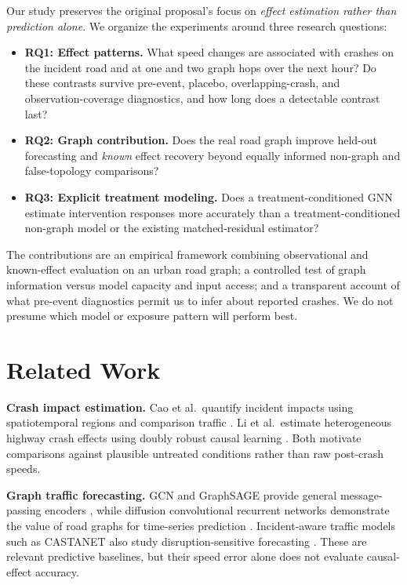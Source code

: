 \documentclass[sigconf,nonacm]{acmart}
\begin{document}
Our study preserves the original proposal's focus on \emph{effect
estimation rather than prediction alone}. We organize the experiments
around three research questions:
\begin{itemize}
  \item \textbf{RQ1: Effect patterns.} What speed changes are associated
  with crashes on the incident road and at one and two graph hops over
  the next hour? Do these contrasts survive pre-event, placebo,
  overlapping-crash, and observation-coverage diagnostics, and how
  long does a detectable contrast last?
  \item \textbf{RQ2: Graph contribution.} Does the real road graph
  improve held-out forecasting and \emph{known} effect recovery beyond
  equally informed non-graph and false-topology comparisons?
  \item \textbf{RQ3: Explicit treatment modeling.} Does a
  treatment-conditioned GNN estimate intervention responses more
  accurately than a treatment-conditioned non-graph model or the
  existing matched-residual estimator?
\end{itemize}

The contributions are an empirical framework combining observational
and known-effect evaluation on an urban road graph; a controlled test
of graph information versus model capacity and input access; and a
transparent account of what pre-event diagnostics permit us to infer
about reported crashes. We do not presume which model or exposure
pattern will perform best.

\section{Related Work}
\textbf{Crash impact estimation.} Cao et al.\ quantify incident
impacts using spatiotemporal regions and comparison traffic
\cite{cao2021traffic}. Li et al.\ estimate heterogeneous highway
crash effects using doubly robust causal learning
\cite{li2024crash}. Both motivate comparisons against plausible
untreated conditions rather than raw post-crash speeds.

\textbf{Graph traffic forecasting.} GCN and GraphSAGE provide general
message-passing encoders \cite{kipf2017gcn,hamilton2017graphsage},
while diffusion convolutional recurrent networks demonstrate the
value of road graphs for time-series prediction
\cite{li2018dcrnn}. Incident-aware traffic models such as CASTANET
also study disruption-sensitive forecasting
\cite{kitahara2026castanet}. These are relevant predictive baselines,
but their speed error alone does not evaluate causal-effect accuracy.
\end{document}
